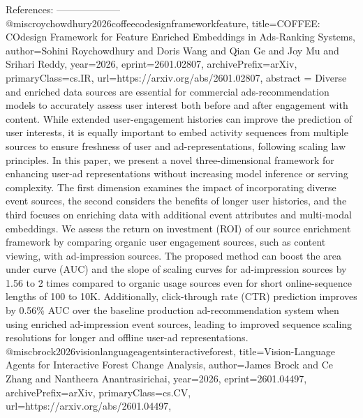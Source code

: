         References:
        --------------------
        @misc{roychowdhury2026coffeecodesignframeworkfeature,
      title={COFFEE: COdesign Framework for Feature Enriched Embeddings in Ads-Ranking Systems}, 
      author={Sohini Roychowdhury and Doris Wang and Qian Ge and Joy Mu and Srihari Reddy},
      year={2026},
      eprint={2601.02807},
      archivePrefix={arXiv},
      primaryClass={cs.IR},
      url={https://arxiv.org/abs/2601.02807},
      abstract = {Diverse and enriched data sources are essential for commercial ads-recommendation models to accurately assess user interest both before and after engagement with content. While extended user-engagement histories can improve the prediction of user interests, it is equally important to embed activity sequences from multiple sources to ensure freshness of user and ad-representations, following scaling law principles. In this paper, we present a novel three-dimensional framework for enhancing user-ad representations without increasing model inference or serving complexity. The first dimension examines the impact of incorporating diverse event sources, the second considers the benefits of longer user histories, and the third focuses on enriching data with additional event attributes and multi-modal embeddings. We assess the return on investment (ROI) of our source enrichment framework by comparing organic user engagement sources, such as content viewing, with ad-impression sources. The proposed method can boost the area under curve (AUC) and the slope of scaling curves for ad-impression sources by 1.56 to 2 times compared to organic usage sources even for short online-sequence lengths of 100 to 10K. Additionally, click-through rate (CTR) prediction improves by 0.56\% AUC over the baseline production ad-recommendation system when using enriched ad-impression event sources, leading to improved sequence scaling resolutions for longer and offline user-ad representations.}
}@misc{brock2026visionlanguageagentsinteractiveforest,
      title={Vision-Language Agents for Interactive Forest Change Analysis}, 
      author={James Brock and Ce Zhang and Nantheera Anantrasirichai},
      year={2026},
      eprint={2601.04497},
      archivePrefix={arXiv},
      primaryClass={cs.CV},
      url={https://arxiv.org/abs/2601.04497},
}
